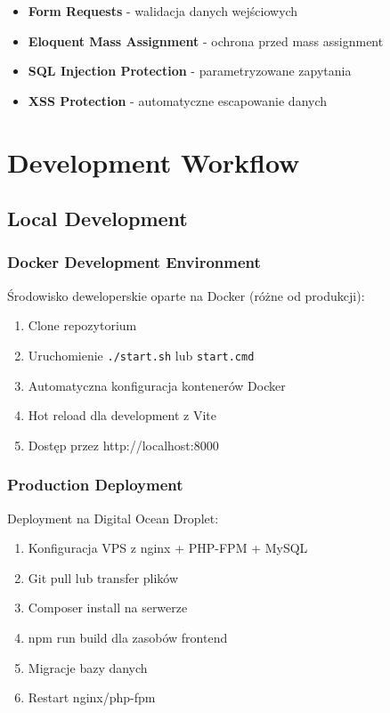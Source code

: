     \begin{itemize}
        \item \textbf{Form Requests} - walidacja danych wejściowych
        \item \textbf{Eloquent Mass Assignment} - ochrona przed mass assignment
        \item \textbf{SQL Injection Protection} - parametryzowane zapytania
        \item \textbf{XSS Protection} - automatyczne escapowanie danych
    \end{itemize}

    \section{Development Workflow}

    \subsection{Local Development}

    \subsubsection{Docker Development Environment}
    Środowisko deweloperskie oparte na Docker (różne od produkcji):

    \begin{enumerate}
        \item Clone repozytorium
        \item Uruchomienie \texttt{./start.sh} lub \texttt{start.cmd}
        \item Automatyczna konfiguracja kontenerów Docker
        \item Hot reload dla development z Vite
        \item Dostęp przez http://localhost:8000
    \end{enumerate}

    \subsubsection{Production Deployment}
    Deployment na Digital Ocean Droplet:

    \begin{enumerate}
        \item Konfiguracja VPS z nginx + PHP-FPM + MySQL
        \item Git pull lub transfer plików
        \item Composer install na serwerze
        \item npm run build dla zasobów frontend
        \item Migracje bazy danych
        \item Restart nginx/php-fpm
    \end{enumerate}

